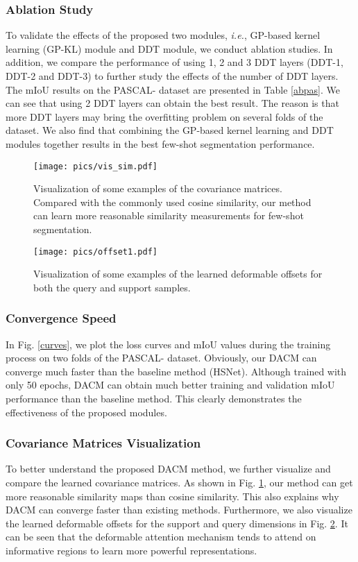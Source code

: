 \documentclass[runningheads]{llncs}
\begin{document}
\subsubsection{Ablation Study}
To validate the effects of the proposed two modules, \textit{i.e.}, GP-based kernel learning (GP-KL) module and DDT module, we conduct ablation studies. In addition, we compare the performance of using 1, 2 and 3 DDT layers (DDT-1, DDT-2 and DDT-3) to further study the effects of the number of DDT layers. The mIoU results on the PASCAL- dataset are presented in Table \ref{abpas}. We can see that using 2 DDT layers can obtain the best result. The reason is that more DDT layers may bring the overfitting problem on several folds of the dataset. We also find that combining the GP-based kernel learning and DDT modules together results in the best few-shot segmentation performance.
\begin{figure}[t]
	\centering
	\texttt{[image: pics/vis\_sim.pdf]}
	\caption{Visualization of some examples of the covariance matrices. Compared with the commonly used cosine similarity, our method can learn more reasonable similarity measurements for few-shot segmentation.}
	\label{simmap}
\end{figure} 
\begin{figure}[t]
	\centering
	\texttt{[image: pics/offset1.pdf]}
	\caption{Visualization of some examples of the learned deformable offsets for both the query and support samples.}
	\label{vis_defor}
\end{figure} 
\subsubsection{Convergence Speed}
In Fig. \ref{curves}, we plot the loss curves and mIoU values during the training process on two folds of the PASCAL- dataset. Obviously, our DACM can converge much faster than the baseline method (HSNet). Although trained with only 50 epochs, DACM can obtain much better training and validation mIoU performance than the baseline method. This clearly demonstrates the effectiveness of the proposed modules.
\subsubsection{Covariance Matrices Visualization}
To better understand the proposed DACM method, we further visualize and compare the learned covariance matrices. As shown in Fig. \ref{simmap}, our method can get more reasonable similarity maps than cosine similarity. This also explains why DACM can converge faster than existing methods. Furthermore, we also visualize the learned deformable offsets for the support and query dimensions in Fig. \ref{vis_defor}. It can be seen that the deformable attention mechanism tends to attend on informative regions to learn more powerful representations.
\end{document}
